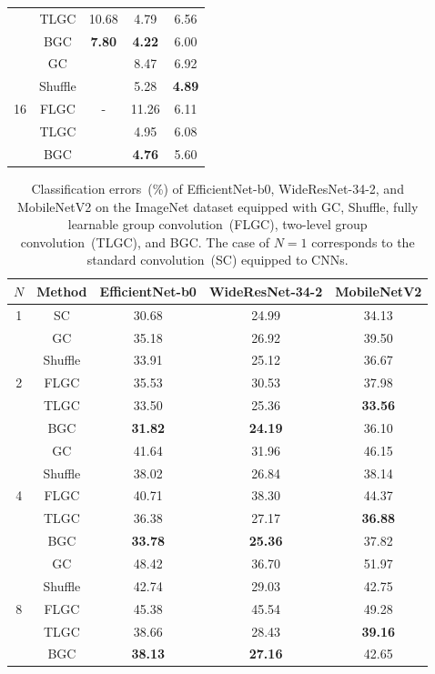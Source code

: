 \documentclass[preprint,12pt,authoryear]{elsarticle}
\numberwithin{equation}{section}
\theoremstyle{remark}
\begin{document}
\begin{table}
\begin{tabular}{c|c|ccc}
                        & TLGC & 10.68 & 4.79 & 6.56 \\
                        & BGC & \textbf{7.80} & \textbf{4.22} & 6.00 \\ \midrule
    \multirow{5}{*}{16} & GC & \multirow{5}{*}{-} & 8.47 & 6.92 \\
                        & Shuffle & & 5.28 & \textbf{4.89} \\
                        & FLGC & & 11.26 & 6.11 \\
                        & TLGC & & 4.95 & 6.08 \\
                        & BGC & & \textbf{4.76} & 5.60 \\ \bottomrule
    \end{tabular}
\end{table}

\begin{table}
  \centering
  \caption{Classification errors~(\%) of EfficientNet-b0, WideResNet-34-2, and MobileNetV2 on the ImageNet dataset equipped with GC, Shuffle, fully learnable group convolution~(FLGC), two-level group convolution~(TLGC), and BGC.
  The case of $N=1$ corresponds to the standard convolution~(SC) equipped to CNNs.}
  \label{tab:comp2}
  \begin{tabular}{c|c|ccc}
  \toprule
  $N$ & Method & EfficientNet-b0 & WideResNet-34-2 & MobileNetV2 \\ \midrule \midrule
  1 & SC & 30.68 & 24.99 & 34.13 \\ \midrule
  \multirow{5}{*}{2} & GC & 35.18 & 26.92 & 39.50 \\
                     & Shuffle & 33.91 & 25.12 & 36.67 \\
                     & FLGC & 35.53 & 30.53 & 37.98 \\
                     & TLGC & 33.50 & 25.36 & \textbf{33.56} \\
                     & BGC & \textbf{31.82} & \textbf{24.19} & 36.10 \\ \midrule
  \multirow{5}{*}{4} & GC & 41.64 & 31.96 & 46.15 \\
                     & Shuffle & 38.02 & 26.84 & 38.14 \\
                     & FLGC & 40.71 & 38.30 & 44.37 \\
                     & TLGC & 36.38 & 27.17 & \textbf{36.88} \\
                     & BGC & \textbf{33.78} & \textbf{25.36} & 37.82 \\ \midrule
  \multirow{5}{*}{8} & GC & 48.42 & 36.70 & 51.97 \\
                     & Shuffle & 42.74 & 29.03 & 42.75 \\
                     & FLGC & 45.38 & 45.54 & 49.28 \\
                     & TLGC & 38.66 & 28.43 & \textbf{39.16} \\
                     & BGC & \textbf{38.13} & \textbf{27.16} & 42.65 \\ \bottomrule
  \end{tabular}
\end{table}
\end{document}
